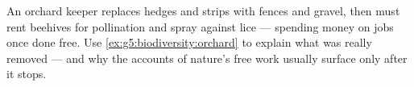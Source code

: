 \begin{exercise}[$\star\star\star$]\label{exo:g5:biodiversity:11}
An orchard keeper replaces hedges and  strips with
fences and gravel, then must rent beehives for pollination
and spray against  lice --- spending money on jobs
once done free. Use \cref{ex:g5:biodiversity:orchard} to
explain what was really removed --- and why the accounts
of nature's free work usually surface only after it stops.
\end{exercise}
